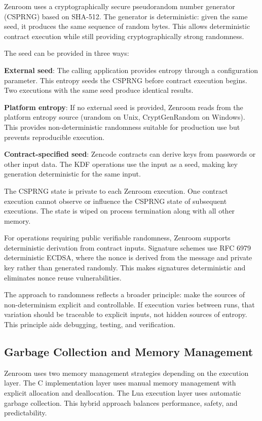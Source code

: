 Zenroom uses a cryptographically secure pseudorandom number generator
(CSPRNG) based on SHA-512. The generator is deterministic: given the
same seed, it produces the same sequence of random bytes. This allows
deterministic contract execution while still providing
cryptographically strong randomness.

The seed can be provided in three ways:

\textbf{External seed}: The calling application provides entropy
through a configuration parameter. This entropy seeds the CSPRNG
before contract execution begins. Two executions with the same seed
produce identical results.

\textbf{Platform entropy}: If no external seed is provided, Zenroom
reads from the platform entropy source (urandom on Unix,
CryptGenRandom on Windows). This provides non-deterministic randomness
suitable for production use but prevents reproducible execution.

\textbf{Contract-specified seed}: Zencode contracts can derive keys
from passwords or other input data. The KDF operations use the input
as a seed, making key generation deterministic for the same input.

The CSPRNG state is private to each Zenroom execution. One contract
execution cannot observe or influence the CSPRNG state of subsequent
executions. The state is wiped on process termination along with all
other memory.

For operations requiring public verifiable randomness, Zenroom
supports deterministic derivation from contract inputs. Signature
schemes use RFC 6979 deterministic ECDSA, where the nonce is derived
from the message and private key rather than generated randomly. This
makes signatures deterministic and eliminates nonce reuse
vulnerabilities.

The approach to randomness reflects a broader principle: make the
sources of non-determinism explicit and controllable. If execution
varies between runs, that variation should be traceable to explicit
inputs, not hidden sources of entropy. This principle aids debugging,
testing, and verification.

\subsection{Garbage Collection and Memory Management}

Zenroom uses two memory management strategies depending on the
execution layer. The C implementation layer uses manual memory
management with explicit allocation and deallocation. The Lua
execution layer uses automatic garbage collection. This hybrid
approach balances performance, safety, and predictability.

